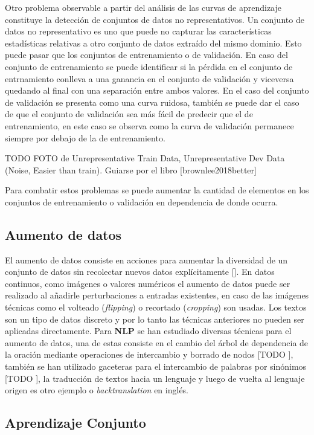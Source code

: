 Otro problema observable a partir del análisis de las curvas de aprendizaje constituye la detección de conjuntos
de datos no representativos. Un conjunto de datos no representativo es uno que puede no 
capturar las características estadísticas relativas a otro conjunto de datos extraído del mismo dominio.
Esto puede pasar que los conjuntos de entrenamiento o de validación. En caso del conjunto de entrenamiento
se puede identificar si la pérdida en el conjunto de entrnamiento conlleva a una ganancia en el conjunto de 
validación y viceversa quedando al final con una separación entre ambos valores. En el caso del conjunto de 
validación se presenta como una curva ruidosa, también se puede dar el caso de que el conjunto  de validación
sea más fácil de predecir que el de entrenamiento, en este caso se observa como la curva de validación permanece
siempre por debajo de la de entrenamiento.

TODO FOTO de Unrepresentative Train Data, Unrepresentative Dev Data (Noise, Easier than train). Guiarse por el libro [brownlee2018better]

Para combatir estos problemas se puede aumentar la cantidad de elementos en los conjuntos de entrenamiento o 
validación en dependencia de donde ocurra.

\subsection{Aumento de datos}

El aumento de datos consiste en acciones para aumentar la diversidad de un conjunto de datos sin recolectar
nuevos datos explícitamente [\cite{feng2021data}]. En datos continuos, como imágenes o valores numéricos el 
aumento de datos puede ser realizado al añadirle perturbaciones a entradas existentes, en caso de las imágenes 
técnicas como el volteado (\emph{flipping}) o recortado (\emph{cropping}) son usadas. Los textos son un tipo 
de datos discreto y por lo tanto las técnicas anteriores no pueden ser aplicadas directamente. Para \textbf{NLP}
se han estudiado diversas técnicas para el aumento de datos, una de estas consiste en el cambio del árbol de 
dependencia de la oración mediante operaciones de intercambio y borrado de nodos [TODO \cite{}], también se han utilizado 
gaceteras para el intercambio de palabras por sinónimos [TODO \cite{}], la traducción de textos hacia un lenguaje y luego 
de vuelta al lenguaje origen es otro ejemplo o \emph{backtranslation} en inglés. 

\subsection{Aprendizaje Conjunto}

